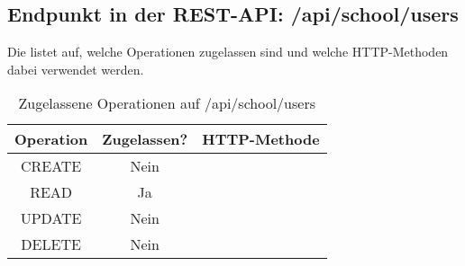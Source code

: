 \subsection{Endpunkt in der REST-API: /api/school/users}
Die  listet auf, welche Operationen zugelassen sind und welche HTTP-Methoden dabei verwendet werden. 


\begin{table}[!htbp]
	\begin{tabular}{|c|c|c|}
		\hline
			\textbf{Operation} & \textbf{Zugelassen?} & \textbf{HTTP-Methode} \\ \hline
			CREATE & Nein & \\ \hline 
			READ & Ja &  \\ \hline
			UPDATE & Nein & \\ \hline 
			DELETE & Nein & \\ \hline
	\end{tabular}

		\caption{Zugelassene Operationen auf /api/school/users}
		\label{tab:end:rest:api:school:users:meth}
\end{table}

